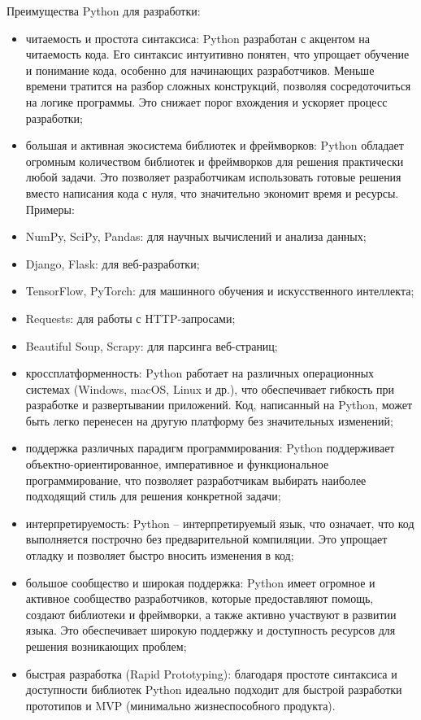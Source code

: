 Преимущества Python для разработки:
\begin{itemize}
\item	читаемость и простота синтаксиса: Python разработан с акцентом на читаемость кода. Его синтаксис интуитивно понятен, что упрощает обучение и понимание кода, особенно для начинающих разработчиков. Меньше времени тратится на разбор сложных конструкций, позволяя сосредоточиться на логике программы. Это снижает порог вхождения и ускоряет процесс разработки;

\item	большая и активная экосистема библиотек и фреймворков: Python обладает огромным количеством библиотек и фреймворков для решения практически любой задачи. Это позволяет разработчикам использовать готовые решения вместо написания кода с нуля, что значительно экономит время и ресурсы. Примеры:

\item	NumPy, SciPy, Pandas: для научных вычислений и анализа данных;

\item	Django, Flask: для веб-разработки;

\item	TensorFlow, PyTorch: для машинного обучения и искусственного интеллекта;

\item	Requests: для работы с HTTP-запросами;

\item	Beautiful Soup, Scrapy: для парсинга веб-страниц;

\item	кроссплатформенность: Python работает на различных операционных системах (Windows, macOS, Linux и др.), что обеспечивает гибкость при разработке и развертывании приложений. Код, написанный на Python, может быть легко перенесен на другую платформу без значительных изменений;

\item	поддержка различных парадигм программирования: Python поддерживает объектно-ориентированное, императивное и функциональное программирование, что позволяет разработчикам выбирать наиболее подходящий стиль для решения конкретной задачи;

\item	интерпретируемость: Python – интерпретируемый язык, что означает, что код выполняется построчно без предварительной компиляции. Это упрощает отладку и позволяет быстро вносить изменения в код;

\item	большое сообщество и широкая поддержка: Python имеет огромное и активное сообщество разработчиков, которые предоставляют помощь, создают библиотеки и фреймворки, а также активно участвуют в развитии языка. Это обеспечивает широкую поддержку и доступность ресурсов для решения возникающих проблем;

\item	быстрая разработка (Rapid Prototyping): благодаря простоте синтаксиса и доступности библиотек Python идеально подходит для быстрой разработки прототипов и MVP (минимально жизнеспособного продукта).
\end{itemize}
